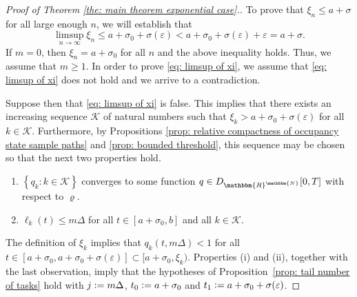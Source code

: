 \documentclass[a4paper, 12pt]{article}
\theoremstyle{definition}
\newcommand{\set}[2]{\left\{#1 : #2\right\}}
\newcommand{\defeq}{\vcentcolon=}
\newcommand{\calK}{\mathcal{K}}
\newcommand{\N}{\mathbbm{N}}
\newcommand{\R}{\mathbbm{R}}
\begin{document}
\begin{proof}[Proof of Theorem \ref{the: main theorem exponential case}.]
To prove that $\xi_n \leq a + \sigma$ for all large enough $n$, we will establish that
\begin{equation}
	\label{eq: limsup of xi}
	\limsup_{n \to \infty} \xi_n \leq a + \sigma_0 + \sigma(\varepsilon) < a + \sigma_0 + \sigma(\varepsilon) + \varepsilon = a + \sigma.
\end{equation}
If $m = 0$, then $\xi_n = a + \sigma_0$ for all $n$ and the above inequality holds. Thus, we assume that $m \geq 1$. In order to prove \eqref{eq: limsup of xi}, we assume that \eqref{eq: limsup of xi} does not hold and we arrive to a contradiction.

Suppose then that \eqref{eq: limsup of xi} is false. This implies that there exists an increasing sequence $\calK$ of natural numbers such that $\xi_k > a + \sigma_0 + \sigma(\varepsilon)$ for all $k \in \calK$. Furthermore, by Propositions \ref{prop: relative compactness of occupancy state sample paths} and \ref{prop: bounded threshold}, this sequence may be chosen so that the next two properties hold.
\begin{enumerate}
	\item[(i)] $\set{q_k}{k \in \calK}$ converges to some function $q \in D_{\R^\N}[0, T]$ with respect to $\varrho$.
	
	\item[(ii)] $\ell_k(t) \leq m \Delta$ for all $t \in [a + \sigma_0, b]$ and all $k \in \calK$.
\end{enumerate}
The definition of $\xi_k$ implies that $q_k(t, m\Delta) < 1$ for all $t \in [a + \sigma_0, a + \sigma_0 + \sigma(\varepsilon)] \subset [a + \sigma_0, \xi_k)$. Properties (i) and (ii), together with the last observation, imply that the hypotheses of Proposition~\ref{prop: tail number of tasks} hold with $j \defeq m \Delta$, $t_0 \defeq a + \sigma_0$ and $t_1 \defeq a + \sigma_0 + \sigma(\varepsilon)$.


\end{proof}
\end{document}
